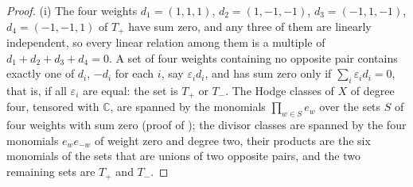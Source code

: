 \documentclass[11pt,reqno]{amsart}
\theoremstyle{plain}
\theoremstyle{definition}
\theoremstyle{remark}
\newcommand{\CC}{\mathbb{C}}
\begin{document}
\begin{proof}
(i) The four weights $d_{1}=(1,1,1)$, $d_{2}=(1,-1,-1)$, $d_{3}=(-1,1,-1)$,
$d_{4}=(-1,-1,1)$ of $T_{+}$ have sum zero, and any three of them are
linearly independent, so every linear relation among them is a multiple of
$d_{1}+d_{2}+d_{3}+d_{4}=0$. A set of four weights containing no opposite
pair contains exactly one of $d_{i}$, $-d_{i}$ for each $i$, say
$\varepsilon_{i}d_{i}$, and has sum zero only if
$\sum_{i}\varepsilon_{i}d_{i}=0$, that is, if all $\varepsilon_{i}$ are
equal: the set is $T_{+}$ or $T_{-}$. The Hodge classes of $X$ of degree
four, tensored with $\CC$, are spanned by the monomials $\prod_{w\in S}e_{w}$
over the sets $S$ of four weights with sum zero (proof of
); the divisor classes are spanned by the four monomials
$e_{w}e_{-w}$ of weight zero and degree two, their products are the six
monomials of the sets that are unions of two opposite pairs, and the two
remaining sets are $T_{+}$ and $T_{-}$.


\end{proof}
\end{document}
